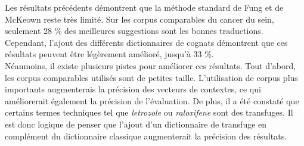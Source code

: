 


Les résultats précédents démontrent que la méthode standard de Fung et de McKeown reste très limité. Sur les corpus comparables du cancer du sein, seulement 28 \% des meilleures suggestions sont les bonnes traductions. Cependant, l'ajout des différents dictionnaires de cognats démontrent que ces résultats peuvent être légèrement amélioré, jusqu'à 33 \%.\\
	
	Néanmoins, il existe plusieurs pistes pour améliorer ces résultats. Tout d'abord, les corpus comparables utilisés sont de petites taille. L'utilisation de corpus plus importants augmenterais la précision des vecteurs de contextes, ce qui améliorerait également la précision de l'évaluation. De plus, il a été constaté que certains termes techniques tel que \textit{letrozole} ou \textit{raloxifene} sont des transfuges. Il est donc logique de penser que l'ajout d'un dictionnaire de transfuge en complément du dictionnaire classique augmenterait la précision des résultats.
